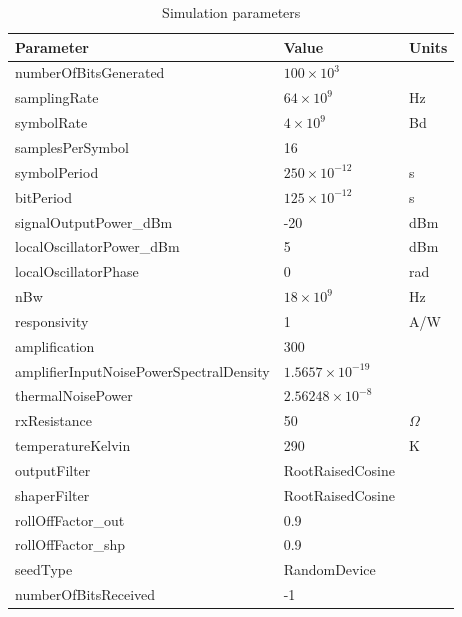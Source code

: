 	\begin{longtable}[h]{|l|l|l|}
	\caption{Simulation parameters\label{tab:simParams_incLO}}\\\hline
	\textbf{Parameter}            & \textbf{Value}       &\textbf{Units}\\\hline
	numberOfBitsGenerated         & $100 \times 10^3$    & \\\hline
	samplingRate                  & $64 \times 10^9$     & Hz \\\hline
	symbolRate                    & $4 \times 10^9$      & Bd \\\hline
	samplesPerSymbol              & 16                   & \\\hline
	symbolPeriod                  & $250\times 10^{-12}$ & s\\\hline
	bitPeriod                     & $125\times 10^{-12}$ & s\\\hline
	signalOutputPower\_dBm        & -20                  & dBm\\\hline
	localOscillatorPower\_dBm     & 5                    & dBm\\\hline
	localOscillatorPhase          & 0                    & rad\\\hline
	nBw                           & $18\times10^9$       & Hz\\\hline
	responsivity                  & 1                    & A/W\\\hline
	amplification                 & 300                  & \\\hline
	amplifierInputNoisePowerSpectralDensity & $1.5657 \times 10^{-19}$ & \\\hline
	thermalNoisePower             & $2.56248 \times 10^{-8}$          & \\\hline
	rxResistance                  & 50 & $\Omega$\\\hline
	temperatureKelvin             & 290 & K\\\hline
	outputFilter                  & RootRaisedCosine     & \\\hline
	shaperFilter                  & RootRaisedCosine     & \\\hline
	rollOffFactor\_out            & 0.9                  & \\\hline
	rollOffFactor\_shp            & 0.9                  & \\\hline
	seedType                      & RandomDevice         & \\\hline
	numberOfBitsReceived          & -1                   & \\\hline

\end{longtable}
